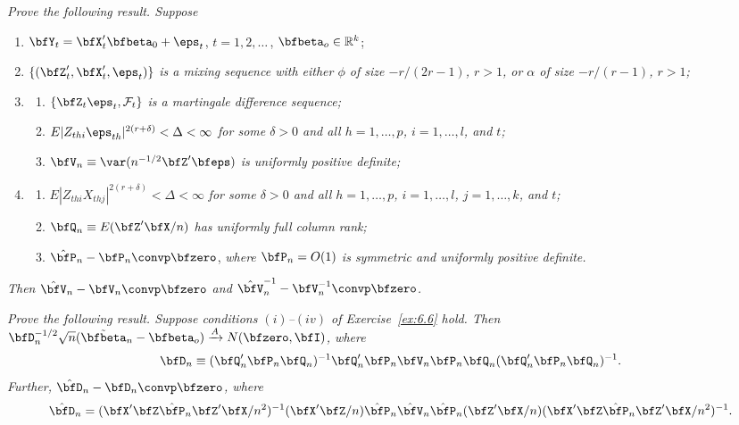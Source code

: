 \begin{exercises}
\item\label{ex:6.6} \textit{Prove the following result. Suppose}
\begin{enumerate}[label=(\roman*)]
  \item $\bfY_t = \bfX_t'\bfbeta_0 + \eps_t$, \quad $t = 1,2,\ldots$\,, \quad $\bfbeta_o \in \mathbb{R}^k$;
  \item $\{(\bfZ_t',\bfX_t',\eps_t)\}$ \textit{is a mixing sequence with either $\phi$ of size $-r/(2r-1)$, $r>1$, or $\alpha$ of size $-r/(r-1)$, $r>1$;}
  \item\begin{enumerate}[label=(\alph*)]
    \item $\{\bfZ_t\eps_t,\mathcal{F}_t\}$ \textit{is a martingale difference sequence;}
    \item $E|Z_{thi}\eps_{th}|^{2(r+\delta)} < \Delta < \infty$ \textit{for some $\delta > 0$ and all $h = 1,\ldots,p$, $i = 1,\ldots,l$, and $t$;}
    \item $\bfV_n \equiv \var(n^{-1/2}\bfZ'\bfeps)$ \textit{is uniformly positive definite;}
  \end{enumerate}
  \item\begin{enumerate}[label=(\alph*)]
    \item $E|Z_{thi}X_{thj}|^{2(r+\delta)} < \Delta < \infty$ \textit{for some $\delta > 0$ and all $h = 1,\ldots,p$, $i = 1,\ldots,l$, $j = 1,\ldots,k$, and $t$;}
    \item $\bfQ_n \equiv E(\bfZ'\bfX/n)$ \textit{has uniformly full column rank;}
    \item $\hat{\bfP}_n - \bfP_n \convp \bfzero$, \textit{where $\bfP_n = O(1)$ is symmetric and uniformly positive definite.}
  \end{enumerate}
\end{enumerate}
\textit{Then $\hat{\bfV}_n - \bfV_n \convp \bfzero$ and $\hat{\bfV}_n^{-1} - \bfV_n^{-1} \convp \bfzero$.}

\item\label{ex:6.7} \textit{Prove the following result. Suppose conditions $(i)$--$(iv)$ of Exercise~\ref{ex:6.6} hold. Then $\bfD_n^{-1/2}\sqrt{n}(\tilde{\bfbeta}_n - \bfbeta_o) \xrightarrow{A} N(\bfzero,\bfI)$, where}
\[
  \bfD_n \equiv (\bfQ_n'\bfP_n\bfQ_n)^{-1}\bfQ_n'\bfP_n\bfV_n\bfP_n\bfQ_n(\bfQ_n'\bfP_n\bfQ_n)^{-1}.
\]
\textit{Further, $\hat{\bfD}_n - \bfD_n \convp \bfzero$, where}
\[
  \hat{\bfD}_n = (\bfX'\bfZ\hat{\bfP}_n\bfZ'\bfX/n^2)^{-1}(\bfX'\bfZ/n)\hat{\bfP}_n\hat{\bfV}_n\hat{\bfP}_n(\bfZ'\bfX/n)(\bfX'\bfZ\hat{\bfP}_n\bfZ'\bfX/n^2)^{-1}.
\]


\end{exercises}
